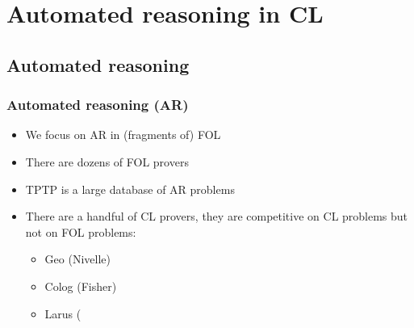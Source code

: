 \documentclass[handout,11pt]{beamer}
\begin{document}
\section{Automated reasoning in CL}

\subsection{Automated reasoning}

\begin{frame}
\frametitle{Automated reasoning (AR)}
 \begin{itemize}[<+->]   %
  \item We focus on AR in (fragments of) FOL
  \item There are dozens of FOL provers
  \item TPTP is a large database of AR problems
  \item There are a handful of CL provers, they are competitive on
  CL problems but not on FOL problems:
  \begin{itemize}[<+->]    
   \item Geo (Nivelle)
   \item Colog (Fisher)
   \item Larus ( 
  \end{itemize}
 \end{itemize}
\end{frame}
\end{document}
